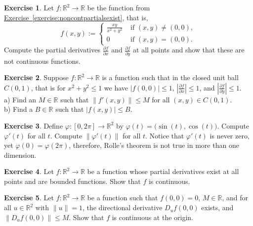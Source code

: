 \documentclass[12pt]{book}
\newcommand{\snorm}[1]{\lVert {#1} \rVert}
\newcommand{\abs}[1]{\left\lvert {#1} \right\rvert}
\newcommand{\R}{{\mathbb{R}}}
\theoremstyle{plain}
\theoremstyle{remark}
\theoremstyle{definition}
\theoremstyle{exercise}
\newtheorem{exercise}{Exercise}[section]
\theoremstyle{example}
\newcommand{\exerciseref}[1]{\hyperref[#1]{Exercise~\ref*{#1}}}
\begin{document}
\begin{exercise}
Let $f \colon \R^2 \to \R$ be the function from
\exerciseref{exercise:noncontpartialsexist}, that is,
\begin{equation*}
f(x,y)
:=
\begin{cases}
\frac{xy}{x^2+y^2} & \text{ if $(x,y) \not= (0,0)$}, \\
0 & \text{ if $(x,y) = (0,0)$}.
\end{cases}
\end{equation*}
Compute the partial derivatives 
$\frac{\partial f}{\partial x}$ and
$\frac{\partial f}{\partial y}$ at all points and show that these are not
continuous functions.
\end{exercise}

\begin{exercise}
Suppose $f \colon \R^2 \to \R$ is a function
such that in the closed unit ball $C(0,1)$, that is
for $x^2+y^2 \leq 1$ we have
$\abs{f(0,0)} \leq 1$,
$\abs{\frac{\partial f}{\partial x}} \leq 1$, and
$\abs{\frac{\partial f}{\partial y}} \leq 1$.\\
a) Find an $M \in \R$ such that $\snorm{f'(x,y)} \leq M$ for all $(x,y) \in
C(0,1)$.\\
b) Find a $B \in \R$ such that
$\abs{f(x,y)} \leq B$.
\end{exercise}

\begin{exercise}
Define $\varphi \colon [0,2\pi] \to \R^2$ by $\varphi(t) =
\bigl(\sin(t),\cos(t)\bigr)$.  Compute $\varphi'(t)$ for all $t$.  Compute
$\snorm{\varphi'(t)}$ for all $t$.  Notice that $\varphi'(t)$ is never zero,
yet $\varphi(0) = \varphi(2\pi)$, therefore, Rolle's theorem is not true
in more than one dimension.
\end{exercise}

\begin{exercise}
Let $f \colon \R^2 \to \R$ be a function whose partial derivatives exist at
all points and are bounded functions.  Show that $f$ is continuous.
\end{exercise}

\begin{exercise}
Let $f \colon \R^2 \to \R$ be a function such that $f(0,0) = 0$, $M \in \R$,
and for all $u \in \R^2$ with $\snorm{u} = 1$, the directional derivative
$D_uf(0,0)$ exists, and $\snorm{D_uf(0,0)} \leq M$.  Show that $f$ is
continuous at the origin.
\end{exercise}

\end{document}
